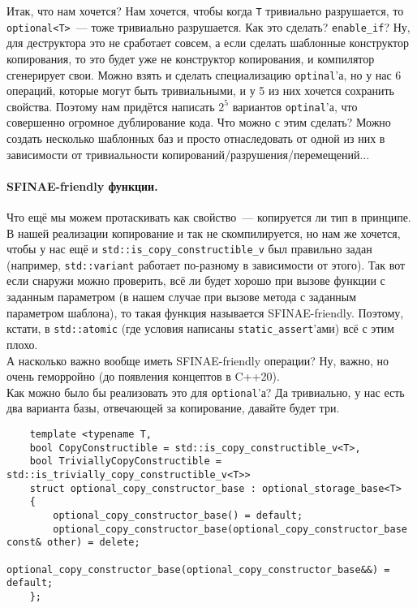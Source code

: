 \documentclass{article}
\begin{document}
    Итак, что нам хочется? Нам хочется, чтобы когда \texttt{T} тривиально разрушается, то \texttt{optional<T>}~--- тоже тривиально разрушается. Как это сделать? \texttt{enable_if}? Ну, для деструктора это не сработает совсем, а если сделать шаблонные конструктор копирования, то это будет уже не конструктор копирования, и компилятор сгенерирует свои. Можно взять и сделать специализацию \texttt{optinal}'а, но у нас 6 операций, которые могут быть тривиальными, и у 5 из них хочется сохранить свойства. Поэтому нам придётся написать $2^5$ вариантов \texttt{optinal}'а, что совершенно огромное дублирование кода. Что можно с этим сделать? Можно создать несколько шаблонных баз и просто отнаследовать от одной из них в зависимости от тривиальности копирований/разрушения/перемещений...
    \paragraph{SFINAE-friendly функции.}
    Что ещё мы можем протаскивать как свойство~--- копируется ли тип в принципе. В нашей реализации копирование и так не скомпилируется, но нам же хочется, чтобы у нас ещё и \texttt{std::is_copy_constructible_v} был правильно задан (например, \texttt{std::variant} работает по-разному в зависимости от этого). Так вот если снаружи можно проверить, всё ли будет хорошо при вызове функции с заданным параметром (в нашем случае при вызове метода с заданным параметром шаблона), то такая функция называется SFINAE-friendly. Поэтому, кстати, в \texttt{std::atomic} (где условия написаны \texttt{static_assert}'ами) всё с этим плохо.\\
    А насколько важно вообще иметь SFINAE-friendly операции? Ну, важно, но очень геморройно (до появления концептов в C++20).\\
    Как можно было бы реализовать это для \texttt{optional}'а? Да тривиально, у нас есть два варианта базы, отвечающей за копирование, давайте будет три.
    \begin{verbatim}
    template <typename T,
    bool CopyConstructible = std::is_copy_constructible_v<T>,
    bool TriviallyCopyConstructible = std::is_trivially_copy_constructible_v<T>>
    struct optional_copy_constructor_base : optional_storage_base<T>
    {
        optional_copy_constructor_base() = default;
        optional_copy_constructor_base(optional_copy_constructor_base const& other) = delete;
        optional_copy_constructor_base(optional_copy_constructor_base&&) = default;
    };
    \end{verbatim}
\end{document}
